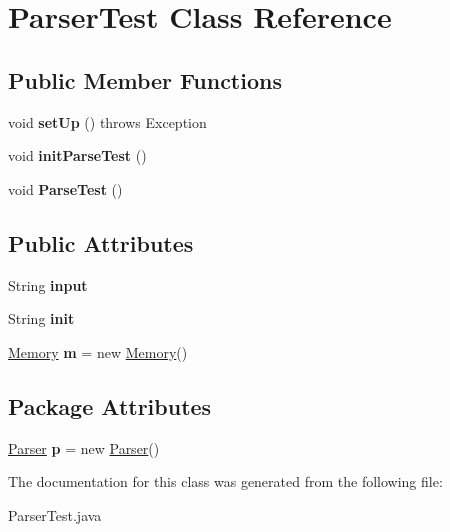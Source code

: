 \hypertarget{classParserTest}{
\section{ParserTest Class Reference}
\label{classParserTest}
}
\subsection*{Public Member Functions}
\begin{DoxyCompactItemize}
\item 
\hypertarget{classParserTest_ad66ad6d8de4db6b9f02f90961bdcf645}{
void {\bfseries setUp} ()  throws Exception }
\label{classParserTest_ad66ad6d8de4db6b9f02f90961bdcf645}

\item 
\hypertarget{classParserTest_a47c06bfcbe3541eed9d03324a19177f8}{
void {\bfseries initParseTest} ()}
\label{classParserTest_a47c06bfcbe3541eed9d03324a19177f8}

\item 
\hypertarget{classParserTest_a470b0285ed54317265bca04c74069e2d}{
void {\bfseries ParseTest} ()}
\label{classParserTest_a470b0285ed54317265bca04c74069e2d}

\end{DoxyCompactItemize}
\subsection*{Public Attributes}
\begin{DoxyCompactItemize}
\item 
\hypertarget{classParserTest_a335745a7bce8efa9d054032414b9ac18}{
String {\bfseries input}}
\label{classParserTest_a335745a7bce8efa9d054032414b9ac18}

\item 
\hypertarget{classParserTest_a2194db23a80f92a8d6b8756d8b4977e5}{
String {\bfseries init}}
\label{classParserTest_a2194db23a80f92a8d6b8756d8b4977e5}

\item 
\hypertarget{classParserTest_ac8ebb9984036312db43ec81148f31dd2}{
\hyperlink{classMemory}{Memory} {\bfseries m} = new \hyperlink{classMemory}{Memory}()}
\label{classParserTest_ac8ebb9984036312db43ec81148f31dd2}

\end{DoxyCompactItemize}
\subsection*{Package Attributes}
\begin{DoxyCompactItemize}
\item 
\hypertarget{classParserTest_a6820fbe9f12b76955e5ffd7e092f6fe8}{
\hyperlink{classParser}{Parser} {\bfseries p} = new \hyperlink{classParser}{Parser}()}
\label{classParserTest_a6820fbe9f12b76955e5ffd7e092f6fe8}

\end{DoxyCompactItemize}


The documentation for this class was generated from the following file:\begin{DoxyCompactItemize}
\item 
ParserTest.java\end{DoxyCompactItemize}
